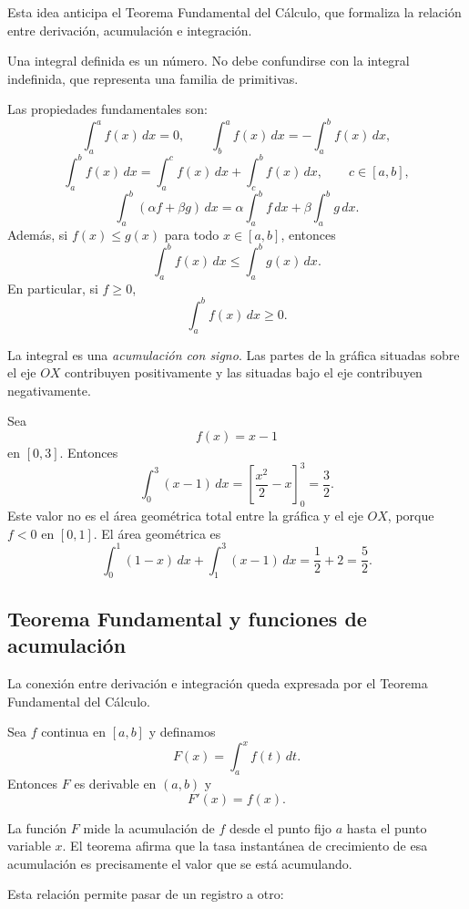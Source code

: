Esta idea anticipa el Teorema Fundamental del Cálculo, que formaliza la relación entre derivación, acumulación e integración.

Una integral definida es un número. No debe confundirse con la integral indefinida, que representa una familia de primitivas.

Las propiedades fundamentales son:
\[
\int_a^a f(x)\,dx=0,
\qquad
\int_b^a f(x)\,dx=-\int_a^b f(x)\,dx,
\]
\[
\int_a^b f(x)\,dx
=
\int_a^c f(x)\,dx+\int_c^b f(x)\,dx,
\qquad c\in[a,b],
\]
\[
\int_a^b(\alpha f+\beta g)\,dx
=
\alpha\int_a^b f\,dx+\beta\int_a^b g\,dx.
\]
Además, si $f(x)\leq g(x)$ para todo $x\in[a,b]$, entonces
\[
\int_a^b f(x)\,dx\leq\int_a^b g(x)\,dx.
\]
En particular, si $f\geq0$,
\[
\int_a^b f(x)\,dx\geq0.
\]

La integral es una \emph{acumulación con signo}. Las partes de la gráfica situadas sobre el eje $OX$ contribuyen positivamente y las situadas bajo el eje contribuyen negativamente.

\begin{example}
Sea
\[
f(x)=x-1
\]
en $[0,3]$. Entonces
\[
\int_0^3(x-1)\,dx
=
\left[\frac{x^2}{2}-x\right]_0^3
=\frac32.
\]
Este valor no es el área geométrica total entre la gráfica y el eje $OX$, porque $f<0$ en $[0,1]$. El área geométrica es
\[
\int_0^1(1-x)\,dx+\int_1^3(x-1)\,dx
=\frac12+2=\frac52.
\]
\end{example}

\subsection{Teorema Fundamental y funciones de acumulación}

La conexión entre derivación e integración queda expresada por el Teorema Fundamental del Cálculo.

\begin{theorem}
Sea $f$ continua en $[a,b]$ y definamos
\[
F(x)=\int_a^x f(t)\,dt.
\]
Entonces $F$ es derivable en $(a,b)$ y
\[
\boxed{F'(x)=f(x).}
\]
\end{theorem}

La función $F$ mide la acumulación de $f$ desde el punto fijo $a$ hasta el punto variable $x$. El teorema afirma que la tasa instantánea de crecimiento de esa acumulación es precisamente el valor que se está acumulando.

Esta relación permite pasar de un registro a otro:

